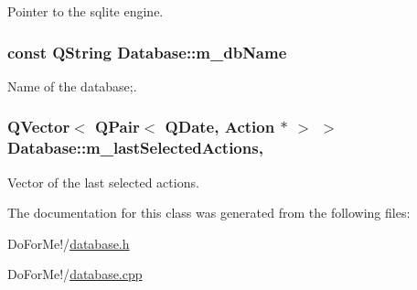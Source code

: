Pointer to the sqlite engine. 

\hypertarget{class_database_ae86350d76c5160ec0bcd2b352e82248a}{
\subsubsection[{m\-\_\-db\-Name}]{\setlength{\rightskip}{0pt plus 5cm}const Q\-String Database\-::m\-\_\-db\-Name\hspace{0.3cm}{\ttfamily [private]}}}\label{class_database_ae86350d76c5160ec0bcd2b352e82248a}


Name of the database;. 

\hypertarget{class_database_a235387dc22dc1a6057af86c330440dca}{
\subsubsection[{m\-\_\-last\-Selected\-Actions}]{\setlength{\rightskip}{0pt plus 5cm}Q\-Vector$<$ Q\-Pair$<$ Q\-Date, {\bf Action} $\ast$ $>$ $>$ Database\-::m\-\_\-last\-Selected\-Actions\hspace{0.3cm}{\ttfamily [static]}, {\ttfamily [private]}}}\label{class_database_a235387dc22dc1a6057af86c330440dca}


Vector of the last selected actions. 



The documentation for this class was generated from the following files\-:\begin{DoxyCompactItemize}
\item 
Do\-For\-Me!/\hyperlink{database_8h}{database.\-h}\item 
Do\-For\-Me!/\hyperlink{database_8cpp}{database.\-cpp}\end{DoxyCompactItemize}
